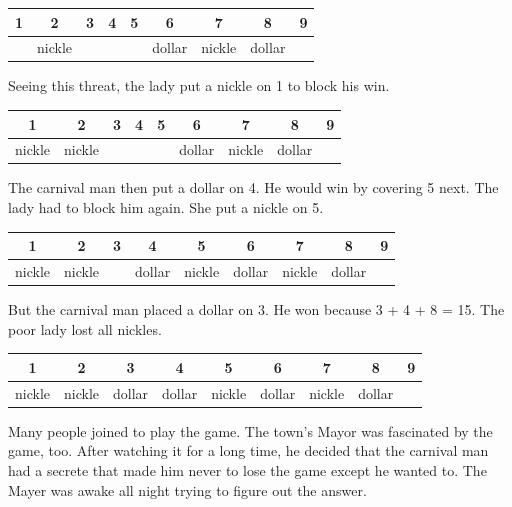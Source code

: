 \documentclass[UTF8]{article}
\begin{document}
\vspace{5mm}
\begin{tabular}{|c|c|c|c|c|c|c|c|c|}
\hline
1 & 2 & 3 & 4 & 5 & 6 & 7 & 8 & 9 \\
\hline
  & nickle  &   &   &   & dollar  & nickle & dollar & \\
\hline
\end{tabular}
\vspace{5mm}

Seeing this threat, the lady put a nickle on 1 to block his win.

\vspace{5mm}
\begin{tabular}{|c|c|c|c|c|c|c|c|c|}
\hline
1 & 2 & 3 & 4 & 5 & 6 & 7 & 8 & 9 \\
\hline
nickle  & nickle  &   &   &   & dollar & nickle & dollar & \\
\hline
\end{tabular}
\vspace{5mm}

The carnival man then put a dollar on 4. He would win by covering 5 next. The lady had to block him again. She put a nickle on 5.

\vspace{5mm}
\begin{tabular}{|c|c|c|c|c|c|c|c|c|}
\hline
1 & 2 & 3 & 4 & 5 & 6 & 7 & 8 & 9 \\
\hline
nickle  & nickle  &   & dollar  & nickle  & dollar  & nickle & dollar & \\
\hline
\end{tabular}
\vspace{5mm}

But the carnival man placed a dollar on 3. He won because 3 + 4 + 8 = 15. The poor lady lost all nickles.

\vspace{5mm}
\begin{tabular}{|c|c|c|c|c|c|c|c|c|}
\hline
1 & 2 & 3 & 4 & 5 & 6 & 7 & 8 & 9 \\
\hline
nickle  & nickle  & dollar  & dollar  & nickle  & dollar  & nickle & dollar & \\
\hline
\end{tabular}
\vspace{5mm}

Many people joined to play the game. The town's Mayor was fascinated by the game, too. After watching it for a long time, he decided that the carnival man had a secrete that made him never to lose the game except he wanted to. The Mayer was awake all night trying to figure out the answer.
\end{document}
